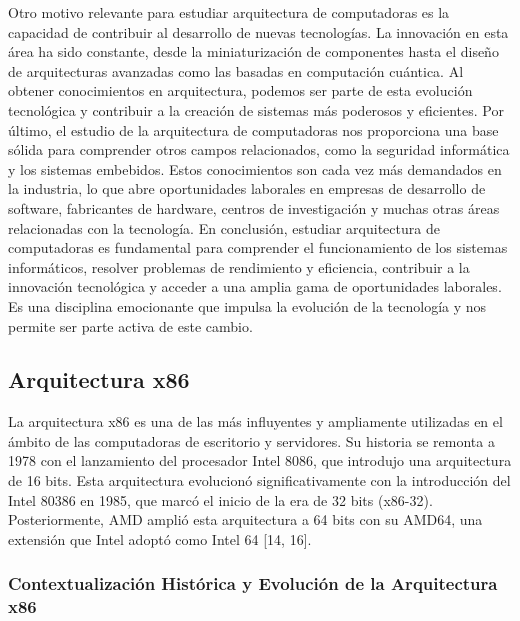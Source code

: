 \documentclass[12pt,twoside]{templates/unerthesis}
\begin{document}
Otro motivo relevante para estudiar arquitectura de computadoras es la capacidad de contribuir al desarrollo de nuevas tecnologías. La innovación en esta área ha sido constante, desde la miniaturización de componentes hasta el diseño de arquitecturas avanzadas como las basadas en computación cuántica. Al obtener conocimientos en arquitectura, podemos ser parte de esta evolución tecnológica y contribuir a la creación de sistemas más poderosos y eficientes.
Por último, el estudio de la arquitectura de computadoras nos proporciona una base sólida para comprender otros campos relacionados, como la seguridad informática y los sistemas embebidos. Estos conocimientos son cada vez más demandados en la industria, lo que abre oportunidades laborales en empresas de desarrollo de software, fabricantes de hardware, centros de investigación y muchas otras áreas relacionadas con la tecnología.
En conclusión, estudiar arquitectura de computadoras es fundamental para comprender el funcionamiento de los sistemas informáticos, resolver problemas de rendimiento y eficiencia, contribuir a la innovación tecnológica y acceder a una amplia gama de oportunidades laborales. Es una disciplina emocionante que impulsa la evolución de la tecnología y nos permite ser parte activa de este cambio.

\hypertarget{arquitectura-x86}{%
\subsection{Arquitectura x86}\label{arquitectura-x86}}

La arquitectura x86 es una de las más influyentes y ampliamente utilizadas en el ámbito de las computadoras de escritorio y servidores. Su historia se remonta a 1978 con el lanzamiento del procesador Intel 8086, que introdujo una arquitectura de 16 bits. Esta arquitectura evolucionó significativamente con la introducción del Intel 80386 en 1985, que marcó el inicio de la era de 32 bits (x86-32). Posteriormente, AMD amplió esta arquitectura a 64 bits con su AMD64, una extensión que Intel adoptó como Intel 64 {[}14, 16{]}.

\hypertarget{contextualizaciuxf3n-histuxf3rica-y-evoluciuxf3n-de-la-arquitectura-x86}{%
\subsubsection{Contextualización Histórica y Evolución de la Arquitectura x86}\label{contextualizaciuxf3n-histuxf3rica-y-evoluciuxf3n-de-la-arquitectura-x86}}
\end{document}

